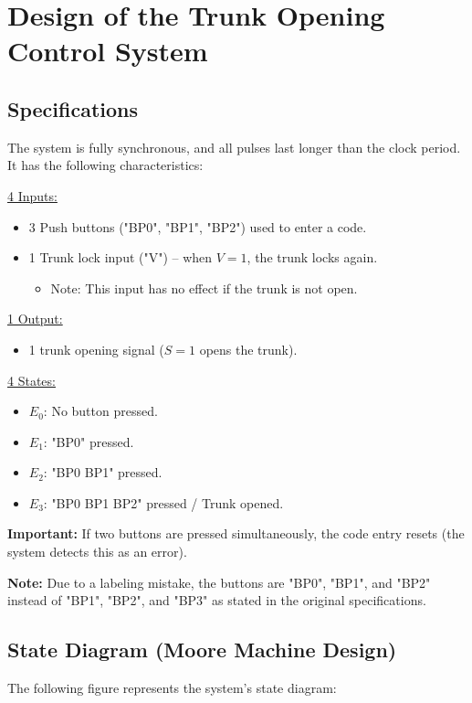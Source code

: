 \section{Design of the Trunk Opening Control System}
\subsection{Specifications}
The system is fully synchronous, and all pulses last longer than the clock period.  
It has the following characteristics:

\underline{4 Inputs:}
\begin{itemize}
    \item 3 Push buttons ("BP0", "BP1", "BP2") used to enter a code.
    \item 1 Trunk lock input ("V") – when $V=1$, the trunk locks again.
    \begin{itemize}
        \item Note: This input has no effect if the trunk is not open.
    \end{itemize}
\end{itemize}

\underline{1 Output:}
\begin{itemize}
    \item 1 trunk opening signal ($S=1$ opens the trunk).
\end{itemize}

\underline{4 States:}
\begin{itemize}
    \item $E_0$: No button pressed.
    \item $E_1$: "BP0" pressed.
    \item $E_2$: "BP0 BP1" pressed.
    \item $E_3$: "BP0 BP1 BP2" pressed / Trunk opened.
\end{itemize}

\textbf{Important:} If two buttons are pressed simultaneously, the code entry resets (the system detects this as an error).  

\textbf{Note:} Due to a labeling mistake, the buttons are "BP0", "BP1", and "BP2" instead of "BP1", "BP2", and "BP3" as stated in the original specifications.

\subsection{State Diagram (Moore Machine Design)}
The following figure represents the system's state diagram:

